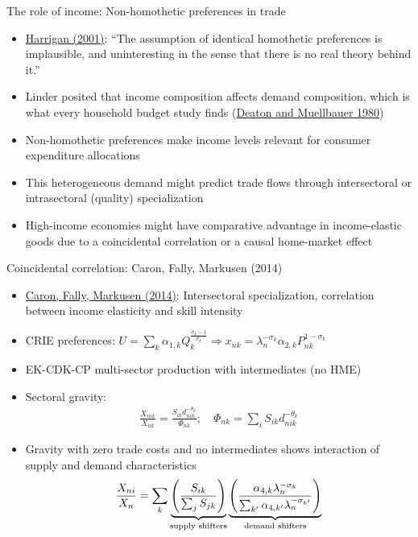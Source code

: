\documentclass[10pt,notes=hide]{beamer}
\begin{document}
\begin{frame}{The role of income: Non-homothetic preferences in trade}
\begin{itemize}
	\item \href{https://www.nber.org/papers/w8675}{Harrigan (2001)}: ``The assumption of identical homothetic preferences is implausible, and uninteresting in the sense that there is no real theory behind it.''
	\item Linder posited that income composition affects demand composition, which is what every household budget study finds (\href{http://www.cambridge.org/us/academic/subjects/economics/microeconomics/economics-and-consumer-behavior?format=PB&isbn=9780521296762}{Deaton and Muellbauer 1980})
	\item Non-homothetic preferences make income levels relevant for consumer expenditure allocations
	\item This heterogeneous demand might predict trade flows through intersectoral or intrasectoral (quality) specialization
	\item High-income economies might have comparative advantage in income-elastic goods due to a coincidental correlation or a causal home-market effect
\end{itemize}
\end{frame}
\begin{frame}{Coincidental correlation: Caron, Fally, Markusen (2014)}
\begin{itemize}
	\item \href{http://qje.oxfordjournals.org/content/129/3/1501}{Caron, Fally, Markusen (2014)}: Intersectoral specialization, correlation between income elasticity and skill intensity
	\item CRIE preferences:	$U = \sum_k \alpha_{1,k} Q_{k}^{\frac{\sigma_k-1}{\sigma_k}} \Rightarrow x_{nk} = \lambda_n^{-\sigma_k} \alpha_{2,k}P_{nk}^{1-\sigma_k}$
	\item EK-CDK-CP multi-sector production with intermediates (no HME)
	\item Sectoral gravity:
	\begin{align*}
	\frac{X_{nik}}{X_{nk}} = \frac{S_{ik} d_{nik}^{-\theta_k}}{\Phi_{nk}} ; \quad \Phi_{nk} = \sum_i S_{ik} d_{nik}^{-\theta_k}
	\end{align*}
	\item Gravity with zero trade costs and no intermediates shows interaction of supply and demand characteristics
\begin{align*}
\frac{X_{ni}}{X_n} = \sum_k \underbrace{\left(\frac{S_{ik}}{\sum_j S_{jk}}\right)}_{\textnormal{supply shifters}} \underbrace{\left(\frac{\alpha_{4,k} \lambda_n^{-\sigma_k}} {\sum_{k'} \alpha_{4,k'} \lambda_n^{-\sigma_{k'}}} \right)}_{\textnormal{demand shifters}}
\end{align*}
\end{itemize}
\end{frame}
\end{document}
